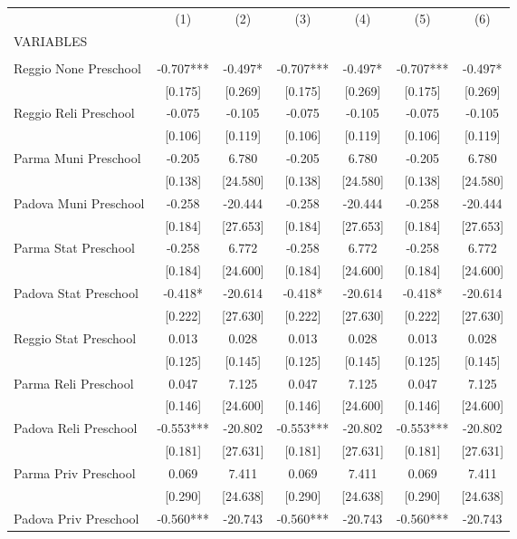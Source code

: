 \begin{tabular}{lcccccc} \hline
 & (1) & (2) & (3) & (4) & (5) & (6) \\
VARIABLES &  &  &  &  &  &  \\ \hline
 &  &  &  &  &  &  \\
Reggio None Preschool & -0.707*** & -0.497* & -0.707*** & -0.497* & -0.707*** & -0.497* \\
 & [0.175] & [0.269] & [0.175] & [0.269] & [0.175] & [0.269] \\
Reggio Reli Preschool & -0.075 & -0.105 & -0.075 & -0.105 & -0.075 & -0.105 \\
 & [0.106] & [0.119] & [0.106] & [0.119] & [0.106] & [0.119] \\
Parma Muni Preschool & -0.205 & 6.780 & -0.205 & 6.780 & -0.205 & 6.780 \\
 & [0.138] & [24.580] & [0.138] & [24.580] & [0.138] & [24.580] \\
Padova Muni Preschool & -0.258 & -20.444 & -0.258 & -20.444 & -0.258 & -20.444 \\
 & [0.184] & [27.653] & [0.184] & [27.653] & [0.184] & [27.653] \\
Parma Stat Preschool & -0.258 & 6.772 & -0.258 & 6.772 & -0.258 & 6.772 \\
 & [0.184] & [24.600] & [0.184] & [24.600] & [0.184] & [24.600] \\
Padova Stat Preschool & -0.418* & -20.614 & -0.418* & -20.614 & -0.418* & -20.614 \\
 & [0.222] & [27.630] & [0.222] & [27.630] & [0.222] & [27.630] \\
Reggio Stat Preschool & 0.013 & 0.028 & 0.013 & 0.028 & 0.013 & 0.028 \\
 & [0.125] & [0.145] & [0.125] & [0.145] & [0.125] & [0.145] \\
Parma Reli Preschool & 0.047 & 7.125 & 0.047 & 7.125 & 0.047 & 7.125 \\
 & [0.146] & [24.600] & [0.146] & [24.600] & [0.146] & [24.600] \\
Padova Reli Preschool & -0.553*** & -20.802 & -0.553*** & -20.802 & -0.553*** & -20.802 \\
 & [0.181] & [27.631] & [0.181] & [27.631] & [0.181] & [27.631] \\
Parma Priv Preschool & 0.069 & 7.411 & 0.069 & 7.411 & 0.069 & 7.411 \\
 & [0.290] & [24.638] & [0.290] & [24.638] & [0.290] & [24.638] \\
Padova Priv Preschool & -0.560*** & -20.743 & -0.560*** & -20.743 & -0.560*** & -20.743 \\

\end{tabular}

